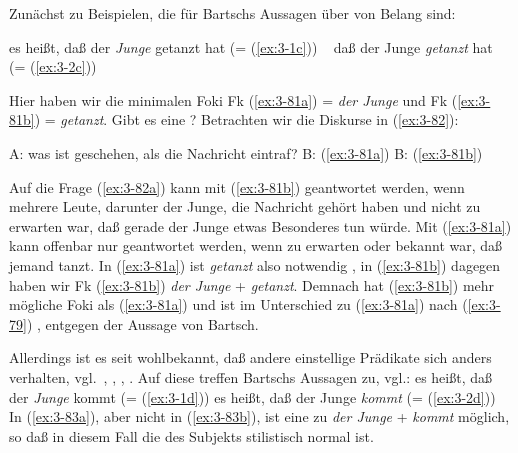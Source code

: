 \documentclass[output=paper]{langsci/langscibook}
\begin{document}
Zunächst zu Beispielen, die für Bartschs Aussagen über
 von Belang sind:
\begin{exe}
\ex
\label{ex:3-81}
\begin{xlist}
\ex
\label{ex:3-81a}
es heißt, daß der \textit{Junge} getanzt hat (= (\ref{ex:3-1c}))
\ex
\label{ex:3-81b}
~\hphantom{es heißt} daß der Junge \textit{getanzt} hat (= (\ref{ex:3-2c}))
\end{xlist}
\end{exe}
Hier haben wir die minimalen Foki Fk (\ref{ex:3-81a}) = \textit{der Junge}
und Fk (\ref{ex:3-81b}) = \textit{getanzt}. Gibt es eine ?
Betrachten wir die Diskurse in (\ref{ex:3-82}):
\begin{exe}
\ex
\label{ex:3-82}
\begin{xlist}
\ex
\label{ex:3-82a}
A: was ist geschehen, als die Nachricht eintraf?
\ex
\label{ex:3-82b}
B: (\ref{ex:3-81a})
\ex
\label{ex:3-82c}
B: (\ref{ex:3-81b})
\end{xlist}
\end{exe}
Auf die Frage (\ref{ex:3-82a}) kann mit (\ref{ex:3-81b}) geantwortet werden, wenn mehrere Leute,
darunter der Junge, die Nachricht gehört haben und nicht zu erwarten
war, daß gerade der Junge etwas Besonderes tun würde. Mit (\ref{ex:3-81a}) kann
offenbar nur geantwortet werden, wenn zu erwarten oder bekannt war,
daß jemand tanzt. In (\ref{ex:3-81a}) ist \textit{getanzt} also notwendig ,
in (\ref{ex:3-81b}) dagegen haben wir Fk (\ref{ex:3-81b}) \textit{der Junge} +
\textit{getanzt}. Demnach hat (\ref{ex:3-81b}) mehr mögliche Foki als (\ref{ex:3-81a}) und
ist im Unterschied zu (\ref{ex:3-81a}) nach (\ref{ex:3-79}) , entgegen der
Aussage von Bartsch.

Allerdings ist es seit \citet{Hatcher56b, Hatcher56a} wohlbekannt, daß
andere einstellige Prädikate sich anders verhalten,
vgl.\ \zb \citet[81 Fn.\,8]{Heidolph70}, \citet[41ff]{Schmerling76},
\citet{Fuchs76}, \citet{AllCrutt79}. Auf diese treffen Bartschs Aussagen
zu, vgl.:
\eal
\label{ex:3-83}
\ex
\label{ex:3-83a}
es heißt, daß der \textit{Junge} kommt (= (\ref{ex:3-1d}))
\ex
\label{ex:3-83b}
es heißt, daß der Junge \textit{kommt} (= (\ref{ex:3-2d}))
\zl
In (\ref{ex:3-83a}), aber nicht in (\ref{ex:3-83b}), ist eine  zu \textit{der Junge} +
\textit{kommt} möglich, so daß in diesem Fall die  des Subjekts
stilistisch normal ist.
\end{document}
